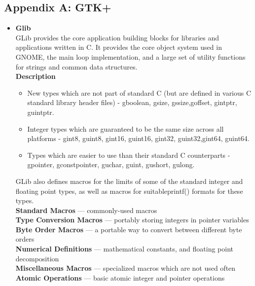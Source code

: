 \documentclass[12pt]{article}
\begin{document}
\subsection*{Appendix A: GTK+}



\newpage




\begin{itemize}

\item \textbf{Glib}\\
GLib provides the core application building blocks for libraries and applications written in C. It provides the core object system used in GNOME, the main loop implementation, and a large set of utility functions for strings and common data structures.\\

\textbf{Description}

\begin{itemize}
\item New types which are not part of standard C (but are defined in various C standard library header files) - gboolean, gsize, gssize,goffset, gintptr, guintptr.
\item Integer types which are guaranteed to be the same size across all platforms - gint8, guint8, gint16, guint16, gint32, guint32,gint64, guint64.
\item Types which are easier to use than their standard C counterparts - gpointer, gconstpointer, guchar, guint, gushort, gulong.



\end{itemize}

GLib also defines macros for the limits of some of the standard integer and floating point types, as well as macros for suitableprintf() formats for these types.\\


\textbf{Standard Macros} — commonly-used macros\\
\textbf{Type Conversion Macros} — portably storing integers in pointer variables\\
\textbf{Byte Order Macros} — a portable way to convert between different byte orders\\
\textbf{Numerical Definitions} — mathematical constants, and floating point decomposition\\
\textbf{Miscellaneous Macros} — specialized macros which are not used often\\
\textbf{Atomic Operations} — basic atomic integer and pointer operations\\


\end{itemize}
\end{document}
